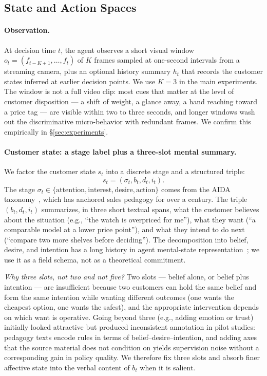 \documentclass{article}
\begin{document}
\subsection{State and Action Spaces}
\label{sec:method:state}

\paragraph{Observation.}
At decision time $t$, the agent observes a short visual window $o_t = (f_{t-K+1}, \ldots, f_t)$ of $K$ frames sampled at one-second intervals from a streaming camera, plus an optional history summary $h_t$ that records the customer states inferred at earlier decision points. We use $K=3$ in the main experiments. The window is not a full video clip: most cues that matter at the level of customer disposition --- a shift of weight, a glance away, a hand reaching toward a price tag --- are visible within two to three seconds, and longer windows wash out the discriminative micro-behavior with redundant frames. We confirm this empirically in §\ref{sec:experiments}.

\paragraph{Customer state: a stage label plus a three-slot mental summary.}
We factor the customer state $s_t$ into a discrete stage and a structured triple:
\[
s_t = (\sigma_t, b_t, d_t, i_t).
\]
The stage $\sigma_t \in \{\text{attention}, \text{interest}, \text{desire}, \text{action}\}$ comes from the AIDA taxonomy~\cite{Lewis1898,StrongHughes}, which has anchored sales pedagogy for over a century. The triple $(b_t, d_t, i_t)$ summarizes, in three short textual spans, what the customer believes about the situation (e.g., ``the watch is overpriced for me''), what they want (``a comparable model at a lower price point''), and what they intend to do next (``compare two more shelves before deciding''). The decomposition into belief, desire, and intention has a long history in agent mental-state representation~\cite{Bratman,RaoBDI}; we use it as a field schema, not as a theoretical commitment.

\textit{Why three slots, not two and not five?} Two slots --- belief alone, or belief plus intention --- are insufficient because two customers can hold the same belief and form the same intention while wanting different outcomes (one wants the cheapest option, one wants the safest), and the appropriate intervention depends on which want is operative. Going beyond three (e.g., adding emotion or trust) initially looked attractive but produced inconsistent annotation in pilot studies: pedagogy texts encode rules in terms of belief--desire--intention, and adding axes that the source material does not condition on yields supervision noise without a corresponding gain in policy quality. We therefore fix three slots and absorb finer affective state into the verbal content of $b_t$ when it is salient.
\end{document}
